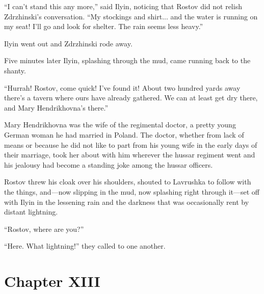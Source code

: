 ``I can't stand this any more,'' said Ilyin, noticing that Rostov
did not relish Zdrzhinski's conversation. ``My stockings and
shirt... and the water is running on my seat! I'll go and look
for shelter. The rain seems less heavy.''

Ilyin went out and Zdrzhinski rode away.

Five minutes later Ilyin, splashing through the mud, came running
back to the shanty.

``Hurrah! Rostov, come quick! I've found it! About two hundred
yards away there's a tavern where ours have already gathered. We
can at least get dry there, and Mary Hendrikhovna's there.''

Mary Hendrikhovna was the wife of the regimental doctor, a pretty
young German woman he had married in Poland. The doctor, whether
from lack of means or because he did not like to part from his
young wife in the early days of their marriage, took her about
with him wherever the hussar regiment went and his jealousy had
become a standing joke among the hussar officers.

Rostov threw his cloak over his shoulders, shouted to Lavrushka
to follow with the things, and---now slipping in the mud, now
splashing right through it---set off with Ilyin in the lessening
rain and the darkness that was occasionally rent by distant
lightning.

``Rostov, where are you?''

``Here. What lightning!'' they called to one another.


\chapter*{Chapter XIII}
\ifaudio     
{} 
\fi

